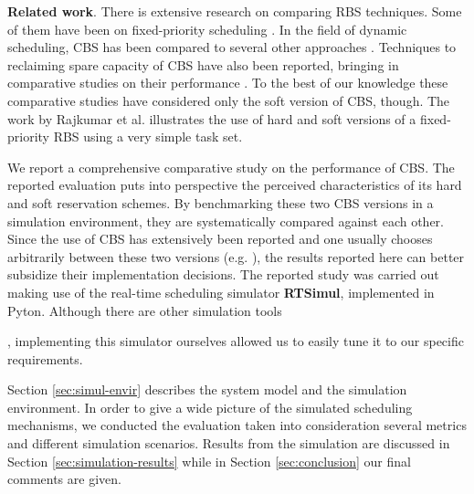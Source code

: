 \documentclass[times, 10pt,twocolumn]{article}
\newcounter{notecounter}
\newcommand{\nota}[1]{\addtocounter{notecounter}{1}{\textcolor{red}{[nota
      \arabic{notecounter}: #1]}}}
\newcommand{\simul}{\textbf{RTSimul}} %
\begin{document}
\textbf{Related work}. There is extensive research on comparing RBS
techniques.  Some of them have been on fixed-priority scheduling
\cite{bernat.ea99:new,bernat.ea02:multiple,davis.ea05:hierarchical,davis.ea95:dual}.
In the field of dynamic scheduling, CBS has been compared to several
other approaches \cite{spuri.ea96:scheduling}.  Techniques to
reclaiming spare capacity of CBS have also been reported, bringing in
comparative studies on their performance
\cite{caccamo.ea00:capacity,lin.ea05:improving}. To the best of our
knowledge these comparative studies have considered only the soft
version of CBS, though.  The work by Rajkumar et
al. \cite{rajkumar.ea01:resource} illustrates the use of hard and soft
versions of a fixed-priority RBS using a very simple task set.

\label{sec:contr-this-paper}

We report a comprehensive comparative study on the performance of
CBS. The reported evaluation puts into perspective the perceived
characteristics of its hard and soft reservation schemes.  By
benchmarking these two CBS versions in a simulation environment, they
are systematically compared against each other.  Since the use of CBS
has extensively been reported and one usually chooses arbitrarily
between these two versions
(e.g. \cite{abeni.ea99:adaptive,abeni.ea05:qos}), the results reported
here can better subsidize their implementation decisions.  The
reported study was carried out making use of the real-time scheduling
simulator \simul{}, implemented in Pyton. Although there are other
simulation tools \nota{citar simTools}, implementing this simulator
ourselves allowed us to easily tune it to our specific requirements.

\label{sec:structure-this-paper}

Section \ref{sec:simul-envir} describes the system model and the
simulation environment.  In order to give a wide picture of the
simulated scheduling mechanisms, we conducted the evaluation taken
into consideration several metrics and different simulation
scenarios. Results from the simulation are discussed in Section
\ref{sec:simulation-results} while in Section \ref{sec:conclusion} our
final comments are given.

\label{sec:simul-envir}
\end{document}
